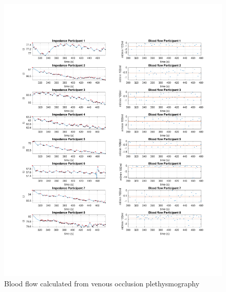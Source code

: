 \begin{figure}
	\includegraphics[width=\textwidth,height=\textheight,keepaspectratio,trim={0.5cm 0.5cm 2cm 2cm},clip]{figure4}    
	\caption{Blood flow calculated from venous occlusion plethysmography}
	\label{fig:blood_flow:venous_occlusion}
\end{figure}

